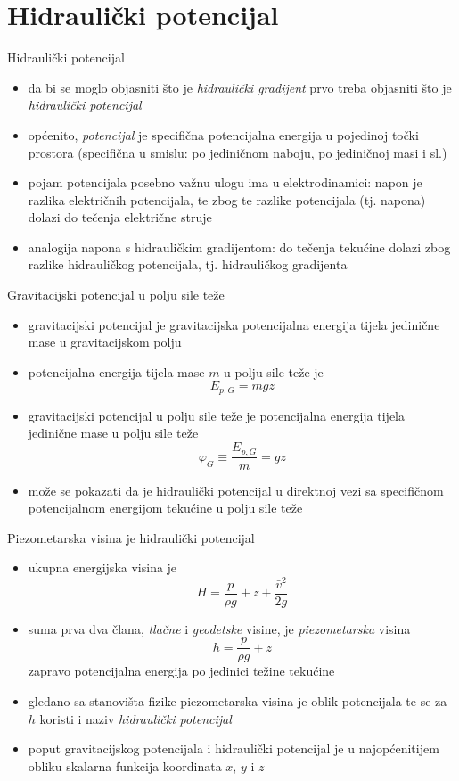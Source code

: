 \documentclass[croatian]{beamer}
\begin{document}
\section{Hidraulički potencijal}
\begin{frame}{Hidraulički potencijal}
\begin{itemize}
\item da bi se moglo objasniti što je \emph{\alert{\emph{hidraulički gradijent}}}
prvo treba objasniti što je \emph{\alert{\emph{hidraulički potencijal}}} 
\item općenito, \emph{\alert{\emph{potencijal}}} je specifična potencijalna
energija u pojedinoj točki prostora (specifična u smislu: po jediničnom
naboju, po jediničnoj masi i sl.) 
\item pojam potencijala posebno važnu ulogu ima u elektrodinamici: napon
je razlika električnih potencijala, te zbog te razlike potencijala
(tj. napona) dolazi do tečenja električne struje 
\item analogija napona s hidrauličkim gradijentom: do tečenja tekućine dolazi
zbog razlike hidrauličkog potencijala, tj. hidrauličkog gradijenta 
\end{itemize}
\end{frame}
%
\begin{frame}{Gravitacijski potencijal u polju sile teže}
\begin{itemize}
\item gravitacijski potencijal je gravitacijska potencijalna energija tijela
jedinične mase u gravitacijskom polju 
\item potencijalna energija tijela mase $m$ u polju sile teže je 
\[
E_{p,G}=mgz
\]
\item gravitacijski potencijal u polju sile teže je potencijalna energija
tijela jedinične mase u polju sile teže 
\[
\varphi_{G}\equiv\frac{E_{p,G}}{m}=gz
\]
\item može se pokazati da je hidraulički potencijal u direktnoj vezi sa
specifičnom potencijalnom energijom tekućine u polju sile teže 
\end{itemize}
\end{frame}
%
\begin{frame}{Piezometarska visina je hidraulički potencijal}
\begin{itemize}
\item ukupna energijska visina je 
\[
H=\frac{p}{\rho g}+z+\frac{\bar{v}^{2}}{2g}
\]
\item suma prva dva člana, \emph{tlačne} i \emph{geodetske} visine, je \emph{piezometarska}
visina 
\[
h=\frac{p}{\rho g}+z
\]
zapravo potencijalna energija po jedinici težine tekućine 
\item gledano sa stanovišta fizike piezometarska visina je oblik potencijala
te se za $h$ koristi i naziv \emph{\alert{\emph{hidraulički potencijal}}} 
\item poput gravitacijskog potencijala i hidraulički potencijal je u najopćenitijem
obliku skalarna funkcija koordinata $x$, $y$ i $z$ 
\end{itemize}
\end{frame}
\end{document}
